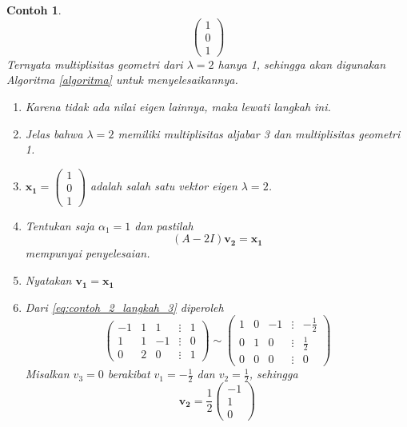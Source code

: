 \documentclass[a4paper]{article}
\theoremstyle{definisi}
\newtheorem{contoh}{Contoh}[section]
\numberwithin{equation}{section}
\begin{document}
\begin{contoh}
\begin{equation*}
\begin{pmatrix}
        1\\0\\1
      \end{pmatrix}
    \end{equation*}
    Ternyata multiplisitas geometri dari $\lambda=2$ hanya 1, sehingga akan digunakan Algoritma \ref{algoritma} untuk menyelesaikannya.
    \begin{enumerate}[label=Langkah \arabic*: ,leftmargin=*]
      \item Karena tidak ada nilai eigen lainnya, maka lewati langkah ini.
      \item Jelas bahwa $\lambda=2$ memiliki multiplisitas aljabar 3 dan multiplisitas geometri 1.
      \item $\mathbf{x_1}=\begin{pmatrix}
        1\\0\\1
      \end{pmatrix}$ adalah salah satu vektor eigen $\lambda=2$.
      \item Tentukan saja $\alpha_1=1$ dan pastilah
      \begin{equation}\label{eq:contoh_2_langkah_3}
        (A-2I)\mathbf{v_2}=\mathbf{x_1}
      \end{equation}
      mempunyai penyelesaian.
      \item Nyatakan $\mathbf{v_1}=\mathbf{x_1}$
      \item Dari \eqref{eq:contoh_2_langkah_3} diperoleh
      \begin{equation*}
        \begin{pmatrix}
          -1&1&1&\vdots&1\\
          1&1&-1&\vdots&0\\
          0&2&0&\vdots&1
        \end{pmatrix}\sim
        \begin{pmatrix}
          1&0&-1&\vdots&-\frac{1}{2}\\
          0&1&0&\vdots&\frac{1}{2}\\
          0&0&0&\vdots&0
        \end{pmatrix}
      \end{equation*}
      Misalkan $v_3=0$ berakibat $v_1=-\frac{1}{2}$ dan $v_2=\frac{1}{2}$, sehingga
      \begin{equation*}
        \mathbf{v_2}=\frac{1}{2}\begin{pmatrix}
          -1\\1\\0
        \end{pmatrix}

\end{equation*}
\end{enumerate}
\end{contoh}
\end{document}
